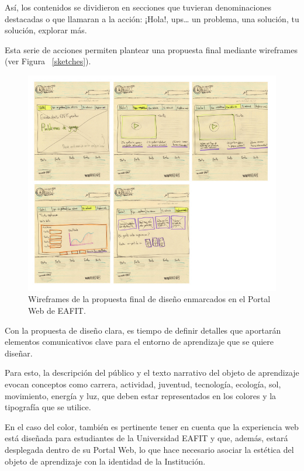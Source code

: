 \documentclass[twoside,letterpaper,12pt]{report}
\begin{document}
Así, los contenidos se dividieron en secciones que tuvieran denominaciones destacadas o que llamaran a la acción: ¡Hola!, ups… un problema, una solución, tu solución, explorar más.

Esta serie de acciones permiten plantear una propuesta final mediante wireframes (ver Figura ~\ref{sketches}).

\begin{figure}[h!]
\label{wireframes}
\includegraphics[width=1\textwidth]{aux/wireframes}
\caption{Wireframes de la propuesta final de diseño enmarcados en el Portal Web de EAFIT.}
\end{figure}


Con la propuesta de diseño clara, es tiempo de definir detalles que aportarán elementos comunicativos clave para el entorno de aprendizaje que se quiere diseñar.

Para esto, la descripción del público y el texto narrativo del objeto de aprendizaje evocan conceptos como carrera, actividad, juventud, tecnología, ecología, sol, movimiento, energía y luz, que deben estar representados en los colores y la tipografía que se utilice.

En el caso del color, también es pertinente tener en cuenta que la experiencia web está diseñada para estudiantes de la Universidad EAFIT y que, además, estará desplegada dentro de su Portal Web, lo que hace necesario asociar la estética del objeto de aprendizaje con la identidad de la Institución.
\end{document}
